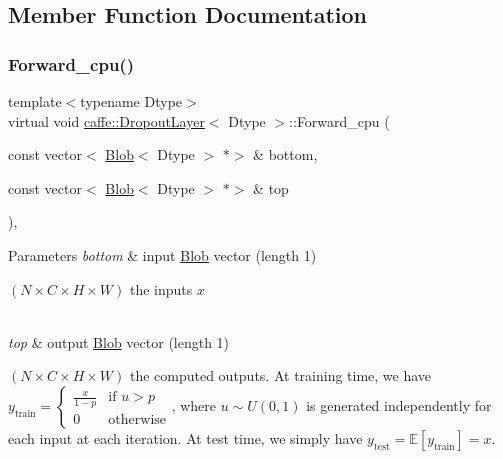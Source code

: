 \subsection{Member Function Documentation}
\mbox{\label{classcaffe_1_1_dropout_layer_a91f6a1b9c2c36f93935320400768c436}} 
\subsubsection{\texorpdfstring{Forward\+\_\+cpu()}{Forward\_cpu()}\hspace{0.1cm}{\footnotesize\ttfamily [1/2]}}
{\footnotesize\ttfamily template$<$typename Dtype$>$ \\
virtual void \mbox{\hyperlink{classcaffe_1_1_dropout_layer}{caffe\+::\+Dropout\+Layer}}$<$ Dtype $>$\+::Forward\+\_\+cpu (\begin{DoxyParamCaption}\item[{const vector$<$ \mbox{\hyperlink{classcaffe_1_1_blob}{Blob}}$<$ Dtype $>$ $\ast$$>$ \&}]{bottom,  }\item[{const vector$<$ \mbox{\hyperlink{classcaffe_1_1_blob}{Blob}}$<$ Dtype $>$ $\ast$$>$ \&}]{top }\end{DoxyParamCaption})\hspace{0.3cm}{\ttfamily [protected]}, {\ttfamily [virtual]}}


\begin{DoxyParams}{Parameters}
{\em bottom} & input \mbox{\hyperlink{classcaffe_1_1_blob}{Blob}} vector (length 1)
\begin{DoxyEnumerate}
\item $ (N \times C \times H \times W) $ the inputs $ x $ 
\end{DoxyEnumerate}\\
\hline
{\em top} & output \mbox{\hyperlink{classcaffe_1_1_blob}{Blob}} vector (length 1)
\begin{DoxyEnumerate}
\item $ (N \times C \times H \times W) $ the computed outputs. At training time, we have $ y_{\mbox{train}} = \left\{ \begin{array}{ll} \frac{x}{1 - p} & \mbox{if } u > p \\ 0 & \mbox{otherwise} \end{array} \right. $, where $ u \sim U(0, 1)$ is generated independently for each input at each iteration. At test time, we simply have $ y_{\mbox{test}} = \mathbb{E}[y_{\mbox{train}}] = x $. 
\end{DoxyEnumerate}\\
\hline
\end{DoxyParams}


